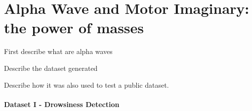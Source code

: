\chapter{Alpha Wave and Motor Imaginary: the power of masses}

First describe what are alpha waves

Describe the dataset generated

Describe how it was also used to test a public dataset.


\subsubsection{Dataset I - Drowsiness Detection}


